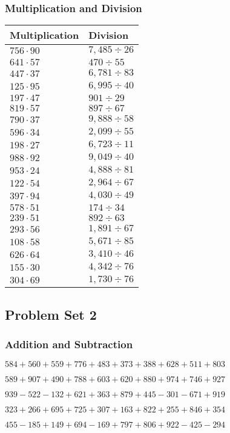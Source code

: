 \hypertarget{multiplication-and-division-101}{%
\subsubsection{Multiplication and
Division}\label{multiplication-and-division-101}}

\begin{longtable}[]{@{}ll@{}}
\toprule
Multiplication & Division\tabularnewline
\midrule
\endhead
\(756 \cdot 90\) & \(7,485÷26\)\tabularnewline
\(641 \cdot 57\) & \(470÷55\)\tabularnewline
\(447 \cdot 37\) & \(6,781÷83\)\tabularnewline
\(125 \cdot 95\) & \(6,995÷40\)\tabularnewline
\(197 \cdot 47\) & \(901÷29\)\tabularnewline
\(819 \cdot 57\) & \(897÷67\)\tabularnewline
\(790 \cdot 37\) & \(9,888÷58\)\tabularnewline
\(596 \cdot 34\) & \(2,099÷55\)\tabularnewline
\(198 \cdot 27\) & \(6,723÷11\)\tabularnewline
\(988 \cdot 92\) & \(9,049÷40\)\tabularnewline
\(953 \cdot 24\) & \(4,888÷81\)\tabularnewline
\(122 \cdot 54\) & \(2,964÷67\)\tabularnewline
\(397 \cdot 94\) & \(4,030÷49\)\tabularnewline
\(578 \cdot 51\) & \(174 ÷ 34\)\tabularnewline
\(239 \cdot 51\) & \(892÷63\)\tabularnewline
\(293 \cdot 56\) & \(1,891÷67\)\tabularnewline
\(108 \cdot 58\) & \(5,671÷85\)\tabularnewline
\(626 \cdot 64\) & \(3,410÷46\)\tabularnewline
\(155 \cdot 30\) & \(4,342÷76\)\tabularnewline
\(304 \cdot 69\) & \(1,730÷76\)\tabularnewline
\bottomrule
\end{longtable}

\hypertarget{problem-set-2-2}{%
\subsection{Problem Set 2}\label{problem-set-2-2}}

\hypertarget{addition-and-subtraction-102}{%
\subsubsection{Addition and
Subtraction}\label{addition-and-subtraction-102}}

\(584 + 560 + 559 + 776 + 483 + 373 + 388 + 628 + 511 + 803\)

\(589 + 907 + 490 + 788 + 603 + 620 + 880 + 974 + 746 + 927\)

\(939 - 522 - 132 + 621 + 363 + 879 + 445 - 301 - 671 + 919\)

\(323 + 266 + 695 + 725 + 307 + 163 + 822 + 255 + 846 + 354\)

\(455 - 185 + 149 + 694 - 169 + 797 + 806 + 922 - 425 - 294\)


